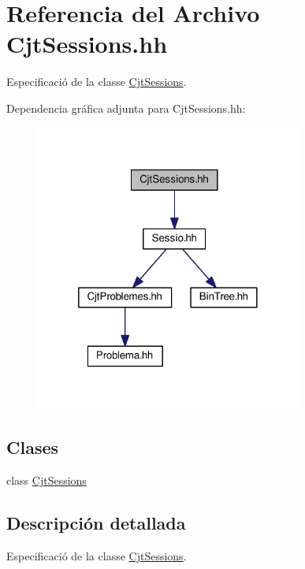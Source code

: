 \hypertarget{_cjt_sessions_8hh}{}\section{Referencia del Archivo Cjt\+Sessions.\+hh}
\label{_cjt_sessions_8hh}


Especificació de la classe \mbox{\hyperlink{class_cjt_sessions}{Cjt\+Sessions}}.  


Dependencia gráfica adjunta para Cjt\+Sessions.\+hh\+:
\nopagebreak
\begin{figure}[H]
\begin{center}
\leavevmode
\includegraphics[width=248pt]{_cjt_sessions_8hh__incl}
\end{center}
\end{figure}
\subsection*{Clases}
\begin{DoxyCompactItemize}
\item 
class \mbox{\hyperlink{class_cjt_sessions}{Cjt\+Sessions}}
\end{DoxyCompactItemize}


\subsection{Descripción detallada}
Especificació de la classe \mbox{\hyperlink{class_cjt_sessions}{Cjt\+Sessions}}. 

